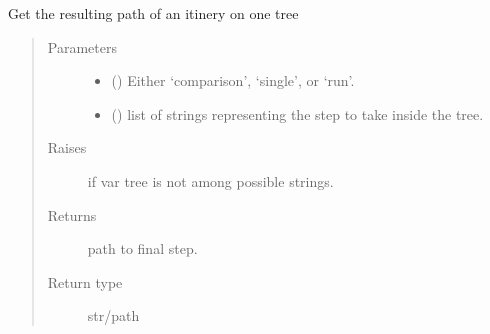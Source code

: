 \documentclass[letterpaper,10pt,english]{sphinxmanual}
\begin{document}
\begin{fulllineitems}
\begin{fulllineitems}
\begin{quote}
\begin{description}
\end{description}\end{quote}

\end{fulllineitems}


\begin{fulllineitems}
\label{\detokenize{api/initobjects:status.Status.get_path}}
\sphinxAtStartPar
Get the resulting path of an itinery on one tree
\begin{quote}\begin{description}
\item[{Parameters}] \leavevmode\begin{itemize}
\item {} 
\sphinxAtStartPar
{} () \textendash{} Either ‘comparison’, ‘single’, or ‘run’.

\item {} 
\sphinxAtStartPar
{} () \textendash{} list of strings representing the step to take inside the tree.

\end{itemize}

\item[{Raises}] \leavevmode
\sphinxAtStartPar
{} \textendash{} if var tree is not among possible strings.

\item[{Returns}] \leavevmode
\sphinxAtStartPar
{} \textendash{} path to final step.

\item[{Return type}] \leavevmode
\sphinxAtStartPar
str/path

\end{description}\end{quote}

\end{fulllineitems}



\end{fulllineitems}
\end{document}
